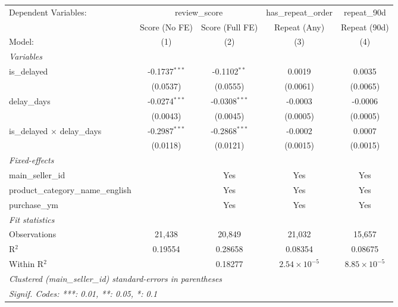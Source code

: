 
\begingroup
\centering
\begin{tabular}{lcccc}
   \tabularnewline \midrule \midrule
   Dependent Variables: & \multicolumn{2}{c}{review\_score} & has\_repeat\_order & repeat\_90d\\
                                       & Score (No FE)   & Score (Full FE) & Repeat (Any)          & Repeat (90d) \\   
   Model:                              & (1)             & (2)             & (3)                   & (4)\\  
   \midrule
   \emph{Variables}\\
   is\_delayed                         & -0.1737$^{***}$ & -0.1102$^{**}$  & 0.0019                & 0.0035\\   
                                       & (0.0537)        & (0.0555)        & (0.0061)              & (0.0065)\\   
   delay\_days                         & -0.0274$^{***}$ & -0.0308$^{***}$ & -0.0003               & -0.0006\\   
                                       & (0.0043)        & (0.0045)        & (0.0005)              & (0.0005)\\   
   is\_delayed $\times$ delay\_days    & -0.2987$^{***}$ & -0.2868$^{***}$ & -0.0002               & 0.0007\\   
                                       & (0.0118)        & (0.0121)        & (0.0015)              & (0.0015)\\   
   \midrule
   \emph{Fixed-effects}\\
   main\_seller\_id                    &                 & Yes             & Yes                   & Yes\\  
   product\_category\_name\_english    &                 & Yes             & Yes                   & Yes\\  
   purchase\_ym                        &                 & Yes             & Yes                   & Yes\\  
   \midrule
   \emph{Fit statistics}\\
   Observations                        & 21,438          & 20,849          & 21,032                & 15,657\\  
   R$^2$                               & 0.19554         & 0.28658         & 0.08354               & 0.08675\\  
   Within R$^2$                        &                 & 0.18277         & $2.54\times 10^{-5}$  & $8.85\times 10^{-5}$\\   
   \midrule \midrule
   \multicolumn{5}{l}{\emph{Clustered (main\_seller\_id) standard-errors in parentheses}}\\
   \multicolumn{5}{l}{\emph{Signif. Codes: ***: 0.01, **: 0.05, *: 0.1}}\\
\end{tabular}
\par\endgroup


